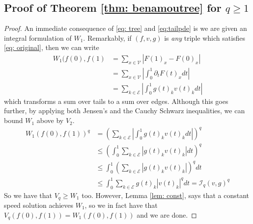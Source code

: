 \documentclass[conference]{IEEEtran}
\newcommand{\VV}{\mathcal{V}}
\newcommand{\EE}{\mathcal{E}}
\theoremstyle{ieeestyle}
\begin{document}
\subsection{Proof of Theorem  \ref{thm: benamoutree} for $q \geq 1$}\label{appendix: thm: benamoutree}
\begin{proof}
    An immediate consequence of \eqref{eq: tree} and \eqref{eq:tailpde} is we are given an integral formulation of $W_1$. Remarkably, if $(f,v,g)$ is \textit{any} triple which satisfies \eqref{eq: original}, then we can write
    \begin{align*}
        W_1(f(0),f(1) &= \sum_{x \in \VV} | F(1)_x - F(0)_x| \\
        &= \sum_{x \in \VV} \left| \int_0^1 \partial_t F(t)_x dt \right| \\
        &= \sum_{k \in \EE} \left| \int_0^1 g(t)_kv(t)_k dt \right|
    \end{align*}
    which transforms a sum over tails to a sum over edges. Although this goes further, by applying both Jensen's and the Cauchy Schwarz inequalities, we can bound $W_1$ above by $V_2$.
    \begin{align*}
        W_1(f(0),f(1))^q &= \left( \sum_{k \in \EE} \left| \int_0^1 g(t)_kv(t)_kdt \right|\right)^q \\
        &\leq \left( \int_0^1 \sum_{k \in \EE} |g(t)_kv(t)_k| dt \right)^q\\
        &\leq \int_0^1 \left( \sum_{k \in \EE} |g(t)_kv(t)_k|\right)^q dt \\
        &\leq \int_0^1 \sum_{k \in \EE} g(t)_k|v(t)_k|^q dt  = \mathcal{I}_q(v,g)^q
    \end{align*}
    So we have that $V_q \geq W_1$ too. However, Lemma \ref{lem: const}, says that a constant speed solution achieves $W_1$, so we in fact have that $V_q(f(0),f(1)) = W_1(f(0),f(1))$ and we are done.
\end{proof}
\end{document}
